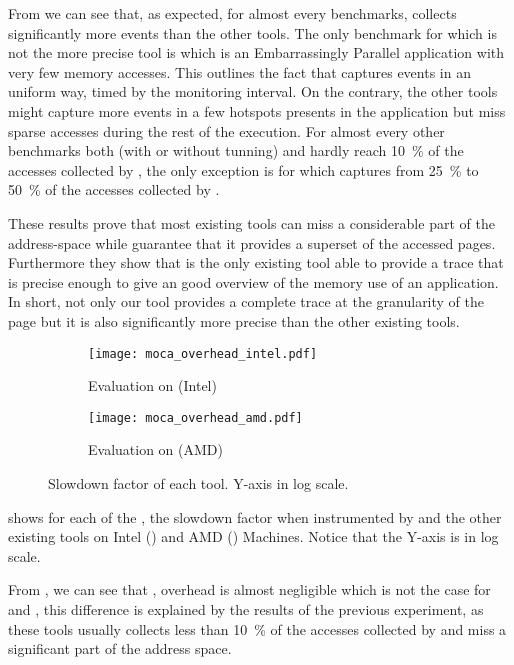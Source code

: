 From  we can see that, as expected, for almost every benchmarks,
\Moca collects significantly more events than the other tools.  The only
benchmark for which \Moca is not the more precise tool is \EP which is an
Embarrassingly Parallel application with very few memory accesses.
This outlines the fact that \Moca captures events in an uniform way, timed by the monitoring interval.
On the contrary, the other tools might capture more events in a few hotspots presents in the application but miss
sparse accesses during the rest of the execution.
For almost
every other benchmarks both \Mitos (with or without tunning) and \MemProf
hardly reach \SI{10}{\%} of the accesses collected by \Moca, the only exception is
\DC for which \MemProf captures from \SI{25}{\%} to \SI{50}{\%} of the accesses
collected by \Moca.

These results prove that most existing tools can miss a considerable part of
the address-space while \Moca guarantee that it provides a superset of the accessed
pages. Furthermore they show that \Moca is the only existing tool able to provide a
trace that is precise enough to give an good overview of the memory use of an application. In
short, not only our tool provides a complete trace at the granularity of the
page but it is also significantly more precise than the other existing tools.

\begin{figure}[htb]
    \centering
    \begin{subfigure}{\linewidth}
        \texttt{[image: moca\_overhead\_intel.pdf]}
        \caption{Evaluation on \Edel (Intel)}
        \label{fig:ovh-Intel}
    \end{subfigure}
    \begin{subfigure}{\linewidth}
        \texttt{[image: moca\_overhead\_amd.pdf]}
        \caption{Evaluation on \Stremi (AMD)}
        \label{fig:ovh-AMD}
    \end{subfigure}
    \caption{Slowdown factor of each tool.
    Y-axis in log scale.}
    \label{fig:ovh}
\end{figure}

 shows for each of the \NPB, the slowdown factor when
instrumented by \Moca and the other existing tools on Intel
() and AMD () Machines. Notice that the Y-axis is in
log scale.

From , we can see that \Mitos, \MitosTun overhead is
almost negligible which is not the case for \Moca and \TABARNAC, this
difference is explained by the results of the previous experiment, as these
tools usually collects less than \SI{10}{\%} of the accesses collected by \Moca and
miss a significant part of the address space.

